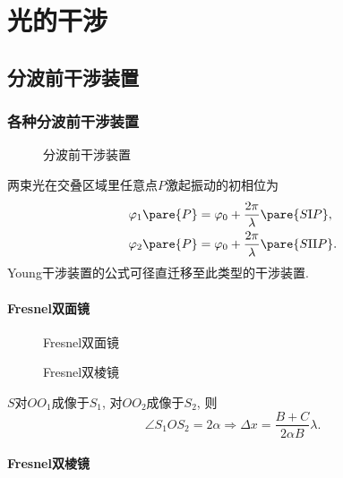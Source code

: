 \documentclass{ctexart}
\begin{document}
\section{光的干涉} %
\label{sec:光的干涉}

\subsection{分波前干涉装置} %
\label{sub:分波前干涉装置}

\subsubsection{各种分波前干涉装置} %
\label{ssub:各种分波前干涉装置}

\begin{figure}[hb]
    \centering
    \caption{分波前干涉装置}
\end{figure}
两束光在交叠区域里任意点$P$激起振动的初相位为
\[ \begin{aligned}
    \varphi_1\pare{P} &= \varphi_0 + \frac{2\pi}{\lambda} \pare{S\mathrm{I}P},\\
    \varphi_2\pare{P} &= \varphi_0 + \frac{2\pi}{\lambda} \pare{S\mathrm{II}P}.
\end{aligned} \]
Young干涉装置的公式可径直迁移至此类型的干涉装置.

\paragraph{Fresnel双面镜} %
\label{par:fresnel双面镜}

\begin{figure}[ht]
    \centering
    \caption{Fresnel双面镜}
\end{figure}
\begin{figure}[ht]
    \centering
    \caption{Fresnel双棱镜}
\end{figure}
$S$对$OO_1$成像于$S_1$, 对$OO_2$成像于$S_2$, 则
\[ \angle S_1OS_2 = 2\alpha\Rightarrow \Delta x = \frac{B+C}{2\alpha B}\lambda. \]


\paragraph{Fresnel双棱镜} %
\label{par:fresnel双棱镜}
\end{document}
